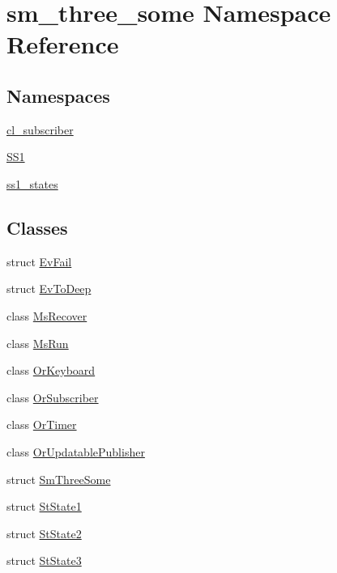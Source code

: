 \hypertarget{namespacesm__three__some}{}\section{sm\+\_\+three\+\_\+some Namespace Reference}
\label{namespacesm__three__some}
\subsection*{Namespaces}
\begin{DoxyCompactItemize}
\item 
 \hyperlink{namespacesm__three__some_1_1cl__subscriber}{cl\+\_\+subscriber}
\item 
 \hyperlink{namespacesm__three__some_1_1SS1}{S\+S1}
\item 
 \hyperlink{namespacesm__three__some_1_1ss1__states}{ss1\+\_\+states}
\end{DoxyCompactItemize}
\subsection*{Classes}
\begin{DoxyCompactItemize}
\item 
struct \hyperlink{structsm__three__some_1_1EvFail}{Ev\+Fail}
\item 
struct \hyperlink{structsm__three__some_1_1EvToDeep}{Ev\+To\+Deep}
\item 
class \hyperlink{classsm__three__some_1_1MsRecover}{Ms\+Recover}
\item 
class \hyperlink{classsm__three__some_1_1MsRun}{Ms\+Run}
\item 
class \hyperlink{classsm__three__some_1_1OrKeyboard}{Or\+Keyboard}
\item 
class \hyperlink{classsm__three__some_1_1OrSubscriber}{Or\+Subscriber}
\item 
class \hyperlink{classsm__three__some_1_1OrTimer}{Or\+Timer}
\item 
class \hyperlink{classsm__three__some_1_1OrUpdatablePublisher}{Or\+Updatable\+Publisher}
\item 
struct \hyperlink{structsm__three__some_1_1SmThreeSome}{Sm\+Three\+Some}
\item 
struct \hyperlink{structsm__three__some_1_1StState1}{St\+State1}
\item 
struct \hyperlink{structsm__three__some_1_1StState2}{St\+State2}
\item 
struct \hyperlink{structsm__three__some_1_1StState3}{St\+State3}
\end{DoxyCompactItemize}
